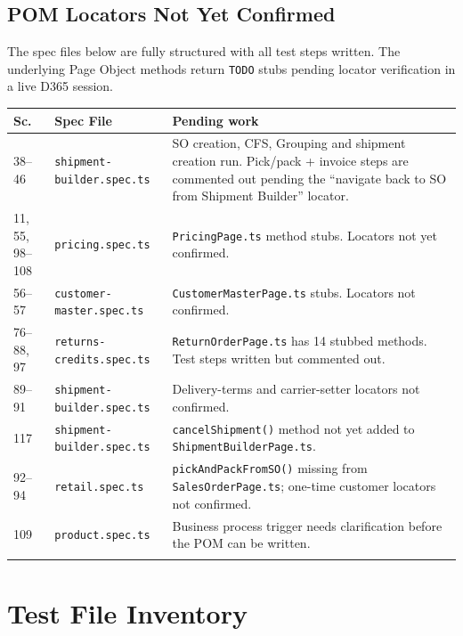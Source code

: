 \documentclass[a4paper,11pt]{article}
\begin{document}
\subsection{POM Locators Not Yet Confirmed}

\noindent The spec files below are fully structured with all test steps written. The underlying Page Object methods return \texttt{TODO} stubs pending locator verification in a live D365 session.

\vspace{0.2cm}
\begin{longtable}{p{} p{} p{}}
\toprule
\textbf{Sc.} & \textbf{Spec File} & \textbf{Pending work} \\
\midrule
\endhead
38--46 & \texttt{shipment-builder.spec.ts} & SO creation, CFS, Grouping and shipment creation run. Pick/pack + invoice steps are commented out pending the ``navigate back to SO from Shipment Builder'' locator. \\\relax
\cmidrule{1-3}
11, 55, 98--108 & \texttt{pricing.spec.ts} & \texttt{PricingPage.ts} method stubs. Locators not yet confirmed. \\\relax
\cmidrule{1-3}
56--57 & \texttt{customer-master.spec.ts} & \texttt{CustomerMasterPage.ts} stubs. Locators not confirmed. \\\relax
\cmidrule{1-3}
76--88, 97 & \texttt{returns-credits.spec.ts} & \texttt{ReturnOrderPage.ts} has 14 stubbed methods. Test steps written but commented out. \\\relax
\cmidrule{1-3}
89--91 & \texttt{shipment-builder.spec.ts} & Delivery-terms and carrier-setter locators not confirmed. \\\relax
\cmidrule{1-3}
117 & \texttt{shipment-builder.spec.ts} & \texttt{cancelShipment()} method not yet added to \texttt{ShipmentBuilderPage.ts}. \\\relax
\cmidrule{1-3}
92--94 & \texttt{retail.spec.ts} & \texttt{pickAndPackFromSO()} missing from \texttt{SalesOrderPage.ts}; one-time customer locators not confirmed. \\\relax
\cmidrule{1-3}
109 & \texttt{product.spec.ts} & Business process trigger needs clarification before the POM can be written. \\\relax
\cmidrule{1-3}
\bottomrule
\end{longtable}

\newpage

\section{Test File Inventory}
\end{document}
